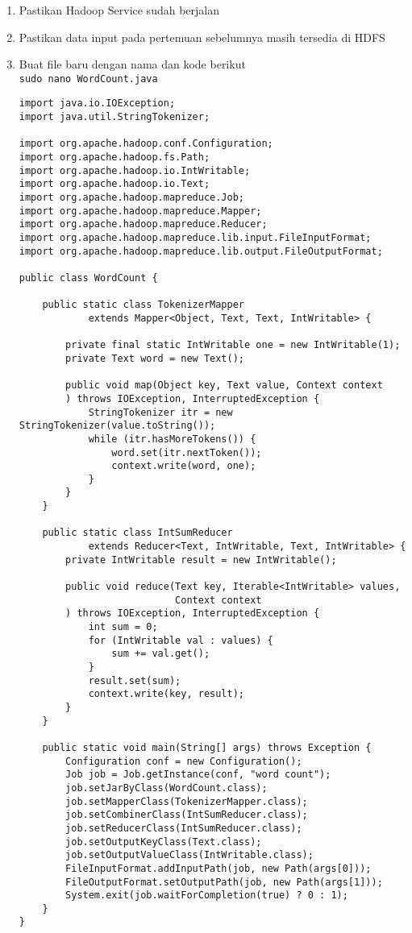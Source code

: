 \documentclass[a4paper]{tufte-handout}
\begin{document}
\begin{enumerate}
\item Pastikan Hadoop Service sudah berjalan
\item Pastikan data input pada pertemuan sebelumnya masih tersedia di HDFS
\item Buat file baru dengan nama dan kode berikut \\

{\tt sudo nano WordCount.java}
\begin{lstlisting}
import java.io.IOException;
import java.util.StringTokenizer;

import org.apache.hadoop.conf.Configuration;
import org.apache.hadoop.fs.Path;
import org.apache.hadoop.io.IntWritable;
import org.apache.hadoop.io.Text;
import org.apache.hadoop.mapreduce.Job;
import org.apache.hadoop.mapreduce.Mapper;
import org.apache.hadoop.mapreduce.Reducer;
import org.apache.hadoop.mapreduce.lib.input.FileInputFormat;
import org.apache.hadoop.mapreduce.lib.output.FileOutputFormat;

public class WordCount {

    public static class TokenizerMapper
            extends Mapper<Object, Text, Text, IntWritable> {

        private final static IntWritable one = new IntWritable(1);
        private Text word = new Text();

        public void map(Object key, Text value, Context context
        ) throws IOException, InterruptedException {
            StringTokenizer itr = new StringTokenizer(value.toString());
            while (itr.hasMoreTokens()) {
                word.set(itr.nextToken());
                context.write(word, one);
            }
        }
    }

    public static class IntSumReducer
            extends Reducer<Text, IntWritable, Text, IntWritable> {
        private IntWritable result = new IntWritable();

        public void reduce(Text key, Iterable<IntWritable> values,
                           Context context
        ) throws IOException, InterruptedException {
            int sum = 0;
            for (IntWritable val : values) {
                sum += val.get();
            }
            result.set(sum);
            context.write(key, result);
        }
    }

    public static void main(String[] args) throws Exception {
        Configuration conf = new Configuration();
        Job job = Job.getInstance(conf, "word count");
        job.setJarByClass(WordCount.class);
        job.setMapperClass(TokenizerMapper.class);
        job.setCombinerClass(IntSumReducer.class);
        job.setReducerClass(IntSumReducer.class);
        job.setOutputKeyClass(Text.class);
        job.setOutputValueClass(IntWritable.class);
        FileInputFormat.addInputPath(job, new Path(args[0]));
        FileOutputFormat.setOutputPath(job, new Path(args[1]));
        System.exit(job.waitForCompletion(true) ? 0 : 1);
    }
}
\end{lstlisting}


\end{enumerate}
\end{document}
